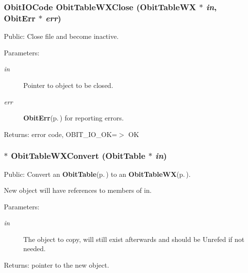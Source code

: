 \subsubsection{\setlength{\rightskip}{0pt plus 5cm}Obit\-IOCode Obit\-Table\-WXClose ({\bf Obit\-Table\-WX} $\ast$ {\em in}, {\bf Obit\-Err} $\ast$ {\em err})}\label{ObitTableWX_8c_a25}


Public: Close file and become inactive. 

\begin{Desc}
\item[Parameters:]
\begin{description}
\item[{\em in}]Pointer to object to be closed. \item[{\em err}]{\bf Obit\-Err}{\rm (p.\,\pageref{structObitErr})} for reporting errors. \end{description}
\end{Desc}
\begin{Desc}
\item[Returns:]error code, OBIT\_\-IO\_\-OK=$>$ OK \end{Desc}
\subsubsection{$\ast$ Obit\-Table\-WXConvert ({\bf Obit\-Table} $\ast$ {\em in})}\label{ObitTableWX_8c_a19}


Public: Convert an {\bf Obit\-Table}{\rm (p.\,\pageref{structObitTable})} to an {\bf Obit\-Table\-WX}{\rm (p.\,\pageref{structObitTableWX})}. 

New object will have references to members of in. \begin{Desc}
\item[Parameters:]
\begin{description}
\item[{\em in}]The object to copy, will still exist afterwards and should be Unrefed if not needed. \end{description}
\end{Desc}
\begin{Desc}
\item[Returns:]pointer to the new object. \end{Desc}
